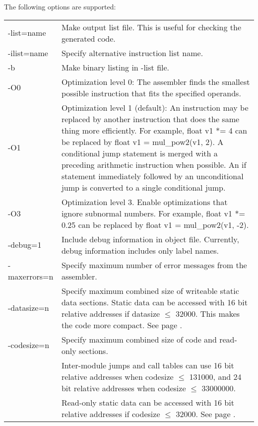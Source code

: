 \documentclass[forwardcom.tex]{subfiles}
\begin{document}
\vv
The following options are supported:\\
\begin{tabular}{|p{25mm}p{135mm}|}
\hline
-list=name & Make output list file. This is useful for checking the generated code.\\
-ilist=name & Specify alternative instruction list name.\\
-b         & Make binary listing in -list file. \\
-O0 & Optimization level 0: The assembler finds the smallest possible instruction that fits the specified operands. \\
-O1 & Optimization level 1 (default): An instruction may be replaced by another instruction that does the same thing more efficiently. For example, \linebreak
{\ttfamily float v1 *= 4} can be replaced by
 {\ttfamily float v1 = mul\_pow2(v1, 2)}. \linebreak
A conditional jump statement is merged with a preceding arithmetic instruction when possible.
 An {\ttfamily if} statement immediately followed by an
 unconditional jump is converted to a single conditional jump.\\
-O3 & Optimization level 3. Enable optimizations that ignore subnormal numbers. For example, {\ttfamily float v1 *= 0.25} can be replaced by {\ttfamily float v1 = mul\_pow2(v1, -2)}.\\
-debug=1  & Include debug information in object file. Currently, debug information includes only label names.\\
-maxerrors=n & Specify maximum number of error messages from the assembler.\\
-datasize=n & Specify maximum combined size of writeable static data sections. Static data can be accessed with 16 bit relative addresses if datasize $\leq$ 32000. 
This makes the code more compact. See page \pageref{SpecifyDataSize}.\\
-codesize=n & Specify maximum combined size of code and read-only sections. \\
           & Inter-module jumps and call tables can use 16 bit relative addresses when codesize $\leq$ 131000, and 24 bit relative addresses when codesize $\leq$ 33000000. \\
           & Read-only static data can be accessed with 16 bit relative addresses if codesize $\leq$ 32000. See page \pageref{SpecifyDataSize}.\\
\hline
\end{tabular}
\vv
\end{document}
